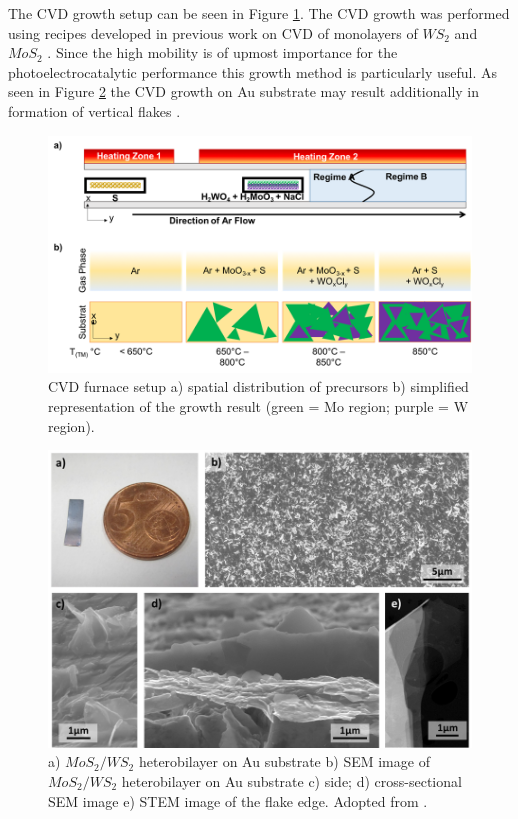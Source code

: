 The CVD growth setup can be seen in Figure \ref{fig:HeterostructureCVDGrowthSetup}. The CVD growth was performed using recipes developed in previous work on CVD of monolayers of $WS_2$ and $MoS_2$ \cite{Reale2017}. Since the high mobility is of upmost importance for the photoelectrocatalytic performance \cite{Li2015a} this growth method is particularly useful. As seen in Figure \ref{fig:HeterostructureSEMImages} the CVD growth on Au substrate may result additionally in formation of vertical flakes \cite{Shi2014}.

\begin{figure}[ht]
	\begin{center}
		\includegraphics[scale=0.4]{Heterostructures/CVDGrowthSetup.png}
		\caption{CVD furnace setup a) spatial distribution of precursors  b) simplified representation of the growth result (green = Mo region;  purple = W region).}
		\label{fig:HeterostructureCVDGrowthSetup}
	\end{center}
\end{figure}

\begin{figure}[ht]
	\begin{center}
		\includegraphics[scale=0.4]{Heterostructures/SEMImages.png}
		\caption{a) $MoS_2/WS_2$ heterobilayer on Au substrate b) SEM image of $MoS_2/WS_2$ heterobilayer on Au substrate c) side; d) cross-sectional SEM image e) STEM image of the flake edge. Adopted from \cite{Sherrell2019}.}
		\label{fig:HeterostructureSEMImages}
	\end{center}
\end{figure}

